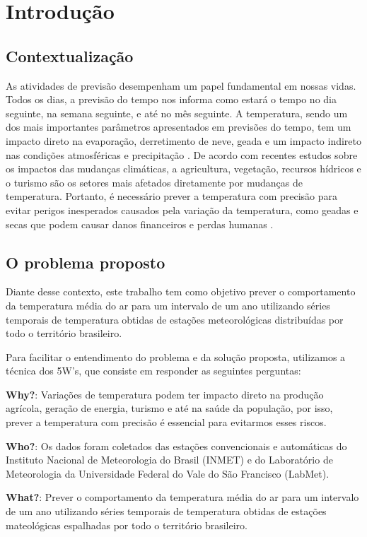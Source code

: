\chapter{Introdução}

\section{Contextualização}
As atividades de previsão desempenham um papel fundamental em nossas vidas. Todos os dias, a previsão do tempo nos informa como estará o tempo no dia seguinte, na semana seguinte, e até no mês seguinte. A temperatura, sendo um dos mais importantes parâmetros apresentados em previsões do tempo, tem um impacto direto na evaporação, derretimento de neve, geada e um impacto indireto nas condições atmosféricas e precipitação \cite{hansen2006global}. De acordo com recentes estudos sobre os impactos das mudanças climáticas, a agricultura, vegetação, recursos hídricos e o turismo são os setores mais afetados diretamente por mudanças de temperatura. Portanto, é necessário prever a temperatura com precisão para evitar perigos inesperados causados pela variação da temperatura, como geadas e secas que podem causar danos financeiros e perdas humanas \cite{kaymaz2005hazards}.

\section{O problema proposto}
Diante desse contexto, este trabalho tem como objetivo prever o comportamento da temperatura média do ar para um intervalo de um ano utilizando séries temporais de temperatura obtidas de estações meteorológicas distribuídas por todo o território brasileiro.

Para facilitar o entendimento do problema e da solução proposta, utilizamos a técnica dos 5W's, que consiste em responder as seguintes perguntas:

\textbf{Why?}: Variações de temperatura podem ter impacto direto na produção agrícola, geração de energia, turismo e até na saúde da população, por isso, prever a temperatura com precisão é essencial para evitarmos esses riscos.

\textbf{Who?}: Os dados foram coletados das estações convencionais e automáticas do Instituto Nacional de Meteorologia do Brasil (INMET) e do Laboratório de Meteorologia da Universidade Federal do Vale do São Francisco (LabMet).

\textbf{What?}: Prever o comportamento da temperatura média do ar para um intervalo de um ano utilizando séries temporais de temperatura obtidas de estações mateológicas espalhadas por todo o território brasileiro.

